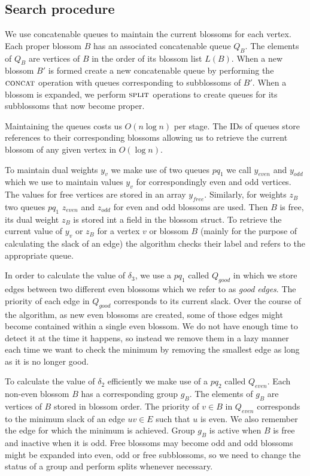 \subsection{Search procedure}

We use concatenable queues to maintain the current blossoms for each vertex. Each proper blossom $B$ has an associated concatenable queue $Q_B$. The elements of $Q_B$ are vertices of $B$ in the order of its blossom list $L(B)$. When a new blossom $B'$ is formed create a new concatenable queue by performing the $\textsc{concat}$ operation with queues corresponding to subblossoms of $B'$. When a blossom is expanded, we perform $\textsc{split}$ operations to create queues for its subblossoms that now become proper.

Maintaining the queues costs us $O(n\log n)$ per stage. The IDs of queues store references to their corresponding blossoms allowing us to retrieve the current blossom of any given vertex in $O(\log n)$.

To maintain dual weights $y_v$ we make use of two queues $pq_1$ we call $y_{even}$ and $y_{odd}$ which we use to maintain values $y_v$ for correspondingly even and odd vertices. The values for free vertices are stored in an array $y_{free}$. Similarly, for weights $z_B$ two queues $pq_1$ $z_{even}$ and $z_{odd}$ for even and odd blossoms are used. Then $B$ is free, its dual weight $z_B$ is stored int a field in the blossom struct. To retrieve the current value of $y_v$ or $z_B$ for a vertex $v$ or blossom $B$ (mainly for the purpose of calculating the slack of an edge) the algorithm checks their label and refers to the appropriate queue.

In order to calculate the value of $\delta_3$, we use a $pq_1$ called $Q_{good}$ in which we store edges between two different even blossoms which we refer to as \textit{good edges}. The priority of each edge in $Q_{good}$ corresponds to its current slack. Over the course of the algorithm, as new even blossoms are created, some of those edges might become contained within a single even blossom. We do not have enough time to detect it at the time it happens, so instead we remove them in a lazy manner each time we want to check the minimum by removing the smallest edge as long as it is no longer good.

To calculate the value of $\delta_2$ efficiently we make use of a $pq_2$ called $Q_{even}$. Each non-even blossom $B$ has a corresponding group $g_B$. The elements of $g_B$ are vertices of $B$ stored in blossom order. The priority of $v \in B$ in $Q_{even}$ corresponds to the minimum slack of an edge $uv \in E$ such that $u$ is even. We also remember the edge for which the minimum is achieved. Group $g_B$ is active when $B$ is free and inactive when it is odd. Free blossoms may become odd and odd blossoms might be expanded into even, odd or free subblossoms, so we need to change the status of a group and perform splits whenever necessary.

